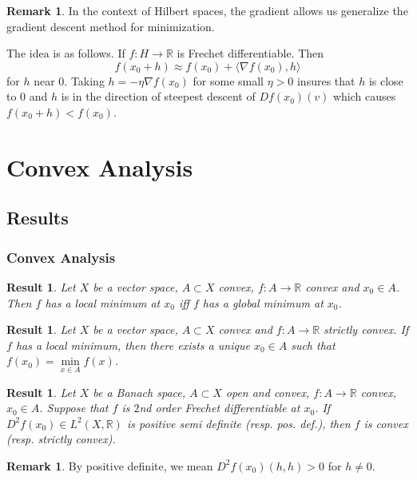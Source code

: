 \documentclass[notheorems]{beamer}
\newtheorem{res}[thm]{Result}
\theoremstyle{definition}
\theoremstyle{definition}
\newtheorem{rem}[definition]{Remark}
\newcommand{\R}{\mathbb{R}}
\renewcommand{\r}{\rangle}
\renewcommand{\l}{\langle}
\begin{document}
\begin{frame}
\begin{rem}
In the context of Hilbert spaces, the gradient allows us generalize the gradient descent method for minimization.

The idea is as follows. If $f:H \rightarrow \R$ is Frechet differentiable. Then $$f(x_0+h) \approx f(x_0) + \l \nabla f(x_0), h \r$$ for $h$ near $0$. Taking $h = - \eta \nabla f(x_0)$ for some small $\eta >0$ insures that $h$ is close to $0$ and $h$ is in the direction of steepest descent of  $Df(x_0)(v)$ which causes $f(x_0+h) < f(x_0)$. 
\end{rem}

\end{frame}















\section{Convex Analysis}

\subsection{Results}
\begin{frame}
\frametitle{Convex Analysis}


\begin{res}
Let $X$ be a vector space, $A \subset X$ convex, $f:A \rightarrow \R$ convex and $x_0 \in A$. Then $f$ has a local minimum at $x_0$ iff $f$ has a global minimum at $x_0$.
\end{res}
\pause

\begin{res}
Let $X$ be a vector space, $A \subset X$ convex and $f:A \rightarrow \R$ strictly convex. If $f$ has a local minimum, then there exists a unique $x_0 \in A$ such that $f(x_0) = \min\limits_{x \in A}f(x)$.
\end{res}
\pause

\begin{res}
Let $X$ be a Banach space, $A \subset X$ open and convex, $f:A \rightarrow \R$ convex, $x_0 \in A$. Suppose that $f$ is $2$nd order Frechet differentiable at $x_0$. If $D^2f(x_0) \in L^2(X, \R)$ is positive semi definite (resp. pos. def.), then $f$ is convex (resp. strictly convex). 
\end{res}
\pause

\begin{rem}
By positive definite, we mean $D^2f(x_0)(h,h) > 0$ for $h \neq 0$.
\end{rem}
\end{frame}
\end{document}
